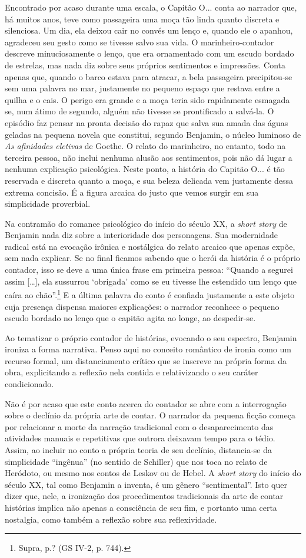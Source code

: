 Encontrado por acaso durante uma escala, o Capitão O... conta ao
narrador que, há muitos anos, teve como passageira uma moça tão linda
quanto discreta e silenciosa. Um dia, ela deixou cair no convés um lenço
e, quando ele o apanhou, agradeceu seu gesto como se tivesse salvo sua
vida. O marinheiro-contador descreve minuciosamente o lenço, que era
ornamentado com um escudo bordado de estrelas, mas nada diz sobre seus
próprios sentimentos e impressões. Conta apenas que, quando o barco
estava para atracar, a bela passageira precipitou-se sem uma palavra no
mar, justamente no pequeno espaço que restava entre a quilha e o cais. O
perigo era grande e a moça teria sido rapidamente esmagada se, num átimo
de segundo, alguém não tivesse se prontificado a salvá-la. O episódio
faz pensar na pronta decisão do rapaz que salva sua amada das águas
geladas na pequena novela que constitui, segundo Benjamin, o núcleo
luminoso de \emph{As afinidades eletivas} de Goethe. O relato do
marinheiro, no entanto, todo na terceira pessoa, não inclui nenhuma
alusão aos sentimentos, pois não dá lugar a nenhuma explicação
psicológica. Neste ponto, a história do Capitão O... é tão reservada e
discreta quanto a moça, e sua beleza delicada vem justamente dessa
extrema concisão. É a figura arcaica do justo que vemos surgir em sua
simplicidade proverbial.

Na contramão do romance psicológico do início do século XX, a
\emph{short story} de Benjamin nada diz sobre a interioridade dos
personagens. Sua modernidade radical está na evocação irônica e
nostálgica do relato arcaico que apenas expõe, sem nada explicar. Se no
final ficamos sabendo que o herói da história é o próprio contador, isso
se deve a uma única frase em primeira pessoa: ``Quando a segurei assim
{[}\ldots{}{]}, ela sussurrou `obrigada' como se eu tivesse lhe
estendido um lenço que caíra ao chão''.\footnote{Supra, p.? (GS IV-2, p.
  744).} E a última palavra do conto é confiada justamente a este objeto
cuja presença dispensa maiores explicações: o narrador reconhece o
pequeno escudo bordado no lenço que o capitão agita ao longe, ao
despedir-se.

Ao tematizar o próprio contador de histórias, evocando o seu espectro,
Benjamin ironiza a forma narrativa. Penso aqui no conceito romântico de
ironia como um recurso formal, um distanciamento crítico que se inscreve
na própria forma da obra, explicitando a reflexão nela contida e
relativizando o seu caráter condicionado.

Não é por acaso que este conto acerca do contador se abre com a
interrogação sobre o declínio da própria arte de contar. O narrador da
pequena ficção começa por relacionar a morte da narração tradicional com
o desaparecimento das atividades manuais e repetitivas que outrora
deixavam tempo para o tédio. Assim, ao incluir no conto a própria teoria
de seu declínio, distancia-se da simplicidade ``ingênua'' (no sentido de
Schiller) que nos toca no relato de Heródoto, ou mesmo nos contos de
Leskov ou de Hebel. A \emph{short story} do início do século XX, tal
como Benjamin a inventa, é um gênero ``sentimental''. Isto quer dizer
que, nele, a ironização dos procedimentos tradicionais da arte de contar
histórias implica não apenas a consciência de seu fim, e portanto uma
certa nostalgia, como também a reflexão sobre sua reflexividade.
